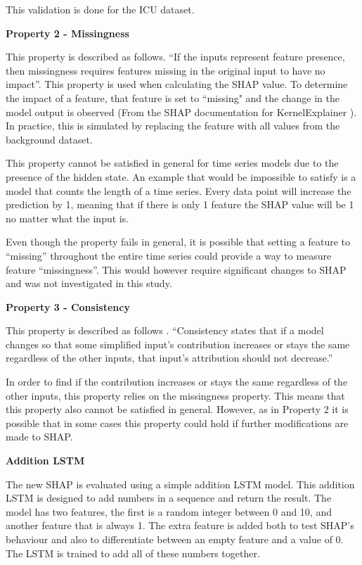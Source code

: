 \documentclass[12pt]{article}
\begin{document}
This validation is done for the ICU dataset. 

\textbf{Property 2 - Missingness}

This property is described as follows. ``If the inputs represent feature presence, then missingness requires features missing in the original input to have no impact''\cite{SHAP}. This property is used when calculating the SHAP value. To determine the impact of a feature, that feature is set to ``missing" and the change in the model output is observed (From the SHAP documentation for KernelExplainer \cite{SHAP}). In practice, this is simulated by replacing the feature with all values from the background dataset. 

This property cannot be satisfied in general for time series models due to the presence of the hidden state. An example that would be impossible to satisfy is a model that counts the length of a time series. Every data point will increase the prediction by 1, meaning that if there is only 1 feature the SHAP value will be 1 no matter what the input is.

Even though the property fails in general, it is possible that setting a feature to ``missing'' throughout the entire time series could provide a way to measure feature ``missingness''. This would however require significant changes to SHAP and was not investigated in this study.

\textbf{Property 3 - Consistency}

This property is described as follows \cite{SHAP}. ``Consistency states that if a model changes so that some simplified input’s contribution increases or stays the same regardless of the other inputs, that input’s attribution should not decrease.'' 

In order to find if the contribution increases or stays the same regardless of the other inputs, this property relies on the missingness property. This means that this property also cannot be satisfied in general. However, as in Property 2 it is possible that in some cases this property could hold if further modifications are made to SHAP. 

\textbf{Addition LSTM}

The new SHAP is evaluated using a simple addition LSTM model. This addition LSTM is designed to add numbers in a sequence and return the result. The model has two features, the first is a random integer between 0 and 10, and another feature that is always 1. 
The extra feature is added both to test SHAP's behaviour and also to differentiate between an empty feature and a value of 0. The LSTM is trained to add all of these numbers together. 
\end{document}
